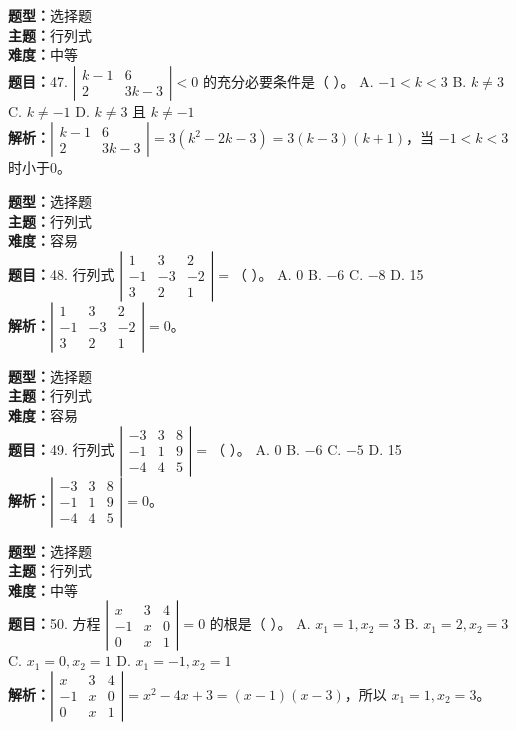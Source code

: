 \documentclass{ctexart}
\newenvironment{question}[5]{%
	\noindent\textbf{题型：}#1\\
	\textbf{主题：}#2\\
	\textbf{难度：}#3\\
	\textbf{题目：}#4\\
	\textbf{解析：}#5\\
	\vspace{1em}
}{}
\begin{document}
\begin{question}
	{选择题}
	{行列式}
	{中等}
	{47. $\left|\begin{array}{cc}k-1 & 6 \\ 2 & 3k-3\end{array}\right|<0$ 的充分必要条件是（ ）。
		A. $-1<k<3$ \quad B. $k\neq3$ \quad C. $k\neq-1$ \quad D. $k\neq3$ 且 $k\neq-1$}
	{$\left|\begin{array}{cc}k-1 & 6 \\ 2 & 3k-3\end{array}\right| = 3(k^2 - 2k - 3) = 3(k - 3)(k + 1)$，当 $-1<k<3$ 时小于0。}
\end{question}

\begin{question}
	{选择题}
	{行列式}
	{容易}
	{48. 行列式 $\left|\begin{array}{ccc}1 & 3 & 2 \\ -1 & -3 & -2 \\ 3 & 2 & 1\end{array}\right|=$（ ）。
		A. 0 \quad B. $-6$ \quad C. $-8$ \quad D. 15}
	{$\left|\begin{array}{ccc}1 & 3 & 2 \\ -1 & -3 & -2 \\ 3 & 2 & 1\end{array}\right|=0$。}
\end{question}

\begin{question}
	{选择题}
	{行列式}
	{容易}
	{49. 行列式 $\left|\begin{array}{lll}-3 & 3 & 8 \\ -1 & 1 & 9 \\ -4 & 4 & 5\end{array}\right|=$（ ）。
		A. 0 \quad B. $-6$ \quad C. $-5$ \quad D. 15}
	{$\left|\begin{array}{lll}-3 & 3 & 8 \\ -1 & 1 & 9 \\ -4 & 4 & 5\end{array}\right|=0$。}
\end{question}

\begin{question}
	{选择题}
	{行列式}
	{中等}
	{50. 方程 $\left|\begin{array}{ccc}x & 3 & 4 \\ -1 & x & 0 \\ 0 & x & 1\end{array}\right|=0$ 的根是（ ）。
		A. $x_1=1, x_2=3$ \quad B. $x_1=2, x_2=3$ \quad C. $x_1=0, x_2=1$ \quad D. $x_1=-1, x_2=1$}
	{$\left|\begin{array}{ccc}x & 3 & 4 \\ -1 & x & 0 \\ 0 & x & 1\end{array}\right| = x^2 - 4x + 3 = (x - 1)(x - 3)$，所以 $x_1=1, x_2=3$。}
\end{question}
\end{document}
